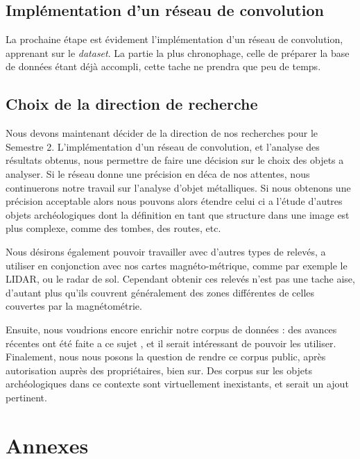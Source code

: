 \documentclass[a4paper, 12pt, titlepage, oneside, french]{article}
\begin{document}
	\subsection{Implémentation d'un réseau de convolution}
	La prochaine étape est évidement l'implémentation d'un réseau de convolution, apprenant sur le \textit{dataset}. La partie la plus chronophage, celle de préparer la base de données étant déjà accompli, cette tache ne prendra que peu de temps. 
	\subsection{Choix de la direction de recherche}
	Nous devons maintenant décider de la direction de nos recherches pour le Semestre 2. L'implémentation d'un réseau de convolution, et l'analyse des résultats obtenus, nous permettre de faire une décision sur le choix des objets a analyser. Si le réseau donne une précision en déca de nos attentes, nous continuerons notre travail sur l'analyse d'objet métalliques. Si nous obtenons une précision acceptable alors nous pouvons alors étendre celui ci a l'étude d'autres objets archéologiques dont la définition en tant que structure dans une image est plus complexe, comme des tombes, des routes, etc. 

	Nous désirons également pouvoir travailler avec d'autres types de relevés, a utiliser en conjonction avec nos cartes magnéto-métrique, comme par exemple le LIDAR, ou le radar de sol. Cependant obtenir ces relevés n'est pas une tache aise, d'autant plus qu'ils couvrent généralement des zones différentes de celles couvertes par la magnétométrie.

	Ensuite, nous voudrions encore enrichir notre corpus de données : des avances récentes ont été faite a ce sujet \cite{Transfo}, et il serait intéressant de pouvoir les utiliser. Finalement, nous nous posons la question de rendre ce corpus public, après autorisation auprès des propriétaires, bien sur. Des corpus sur les objets archéologiques dans ce contexte sont virtuellement inexistants, et serait un ajout pertinent. 
\newpage
\section{Annexes}
\end{document}
